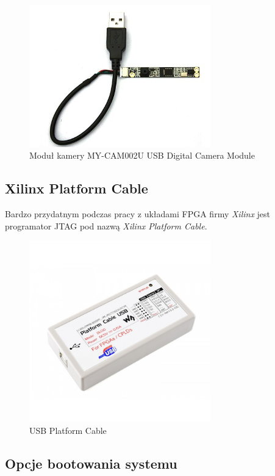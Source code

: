 \begin{figure}[!h]
  \centering
  \includegraphics[width=0.7\textwidth]{img/MY-CAM001U.jpg}
  \caption{Moduł kamery MY-CAM002U USB Digital Camera Module}
  \label{cam-dvp}
\end{figure}



\subsection{Xilinx Platform Cable}

Bardzo przydatnym podczas pracy z układami FPGA firmy \emph{Xilinx} jest programator JTAG pod nazwą \emph{Xilinx Platform Cable}. 

\begin{figure}[!h]
  \centering
  \includegraphics[width=0.7\textwidth]{img/platform-cable.jpg}
  \caption{USB Platform Cable}
  \label{platform-bcable}
\end{figure}


\subsection{Opcje bootowania systemu}

